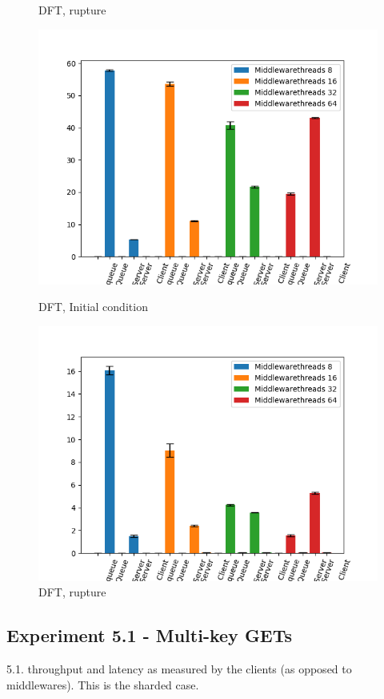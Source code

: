 \documentclass[11pt,a4paper]{article}
\begin{document}
\begin{figure}[H]
\begin{minipage}[b]{0.5\linewidth}
    \caption{DFT, rupture} 
    \vspace{4ex}
  \end{minipage} 
    \begin{minipage}[b]{0.5\linewidth}
    \centering
    \includegraphics[width=0.7\linewidth]{img/exp3_2/exp3_2_mw_percentile_plots_writes_0__vc_32.png} 
    \caption{DFT, Initial condition} 
    \vspace{4ex}
  \end{minipage}%
  \begin{minipage}[b]{0.5\linewidth}
    \centering
    \includegraphics[width=0.7\linewidth]{img/exp3_2/exp3_2_mw_percentile_plots_writes_1__vc_32.png} 
    \caption{DFT, rupture} 
    \vspace{4ex}
  \end{minipage} 
\end{figure}


\subsection{Experiment 5.1 - Multi-key GETs}
5.1. throughput and latency as measured by the clients (as opposed to middlewares).
This is the sharded case.
\end{document}
